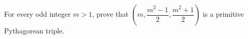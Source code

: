 For every odd integer $m>1$, prove that $\left(m,\dfrac{m^2-1}{2},\dfrac{m^2+1}{2}\right)$ is a primitive Pythagorean triple.
